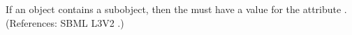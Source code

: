 If an \Event object contains a \Delay subobject, then the \Event must have
a value for the attribute .  (References:
SBML L3V2 .)
